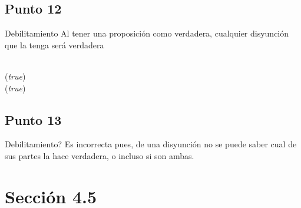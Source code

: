 \documentclass{article}
\begin{document}
\subsection{Punto 12}

\begin{logicenv}{Debilitamiento}
    Al tener una proposición como verdadera, cualquier disyunción que la tenga será verdadera
    \begin{logic}
        \phi\\
        (\phi \equiv \textrm{\textit{true}})\\
        (\psi \lor \textrm{\textit{true}})
    \end{logic}
\end{logicenv}

\subsection{Punto 13}

\begin{logicenv}[5]{Debilitamiento?}
    Es incorrecta pues, de una disyunción no se puede saber cual de sus partes la hace verdadera, o incluso si son ambas.
\end{logicenv}

\section{Sección 4.5}
\end{document}

